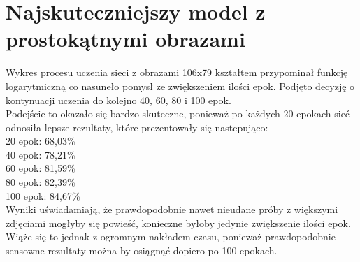 \section{Najskuteczniejszy model z prostokątnymi obrazami}
Wykres procesu uczenia sieci z obrazami 106x79 kształtem przypominał funkcję logarytmiczną
co nasuneło pomysł ze zwiększeniem ilości epok. Podjęto decyzję o kontynuacji uczenia
do kolejno 40, 60, 80 i 100 epok.\\
Podejście to okazało się bardzo skuteczne, ponieważ po każdych 20 epokach
sieć odnosiła lepsze rezultaty, które prezentowały się nastepująco:\\
20 epok: 68,03\%\\
40 epok: 78,21\%\\
60 epok: 81,59\%\\
80 epok: 82,39\%\\
100 epok: 84,67\%\\
Wyniki uświadamiają, że prawdopodobnie nawet nieudane próby z większymi zdjęciami
mogłyby się powieść, konieczne byłoby jedynie zwiększenie ilości epok. Wiąże się to jednak
z ogromnym nakładem czasu, ponieważ prawdopodobnie sensowne rezultaty można by osiągnąć
dopiero po 100 epokach.
